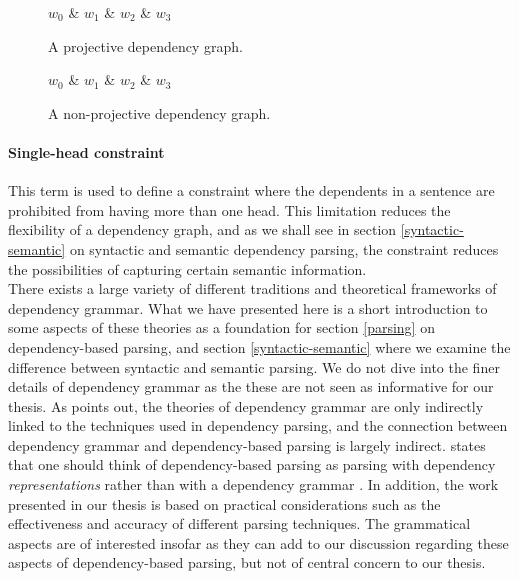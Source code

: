 \begin{figure}
    \begin{dependency}
        \begin{deptext}[column sep=1em, row sep=.1ex]
        $w_0$ \& $w_1$ \& $w_2$ \& $w_3$ \\
        \end{deptext}
    \end{dependency}
    \caption{A projective dependency graph.}
    \label{projective}
\end{figure}

\begin{figure}
    \begin{dependency}
        \begin{deptext}[column sep=1em, row sep=.1ex]
        $w_0$ \& $w_1$ \& $w_2$ \& $w_3$ \\    
        \end{deptext}
    \end{dependency}
    \caption{A non-projective dependency graph.}
    \label{non-projective}
\end{figure}

\paragraph{Single-head constraint} This term is used to define a constraint where the dependents in a sentence are prohibited from having more than one head. This limitation reduces the flexibility of a dependency graph, and as we shall see in section \ref{syntactic-semantic} on syntactic and semantic dependency parsing, the constraint reduces the possibilities of capturing certain semantic information.\\

There exists a large variety of different traditions and theoretical frameworks of dependency grammar. What we have presented here is a short introduction to some aspects of these theories as a foundation for section \ref{parsing} on dependency-based parsing, and section \ref{syntactic-semantic} where we examine the difference between syntactic and semantic parsing. We do not dive into the finer details of dependency grammar as the these are not seen as informative for our thesis. As \citeauthor{Niv:05} points out, the theories of dependency grammar are only indirectly linked to the techniques used in dependency parsing, and the connection between dependency grammar and dependency-based parsing is largely indirect. \citeauthor{Niv:05} states that one should think of dependency-based parsing as parsing with dependency \textit{representations} rather than with a dependency grammar \cite{Niv:05}. In addition, the work presented in our thesis is based on practical considerations such as the effectiveness and accuracy of different parsing techniques. The grammatical aspects are of interested insofar as they can add to our discussion regarding these aspects of dependency-based parsing, but not of central concern to our thesis.


